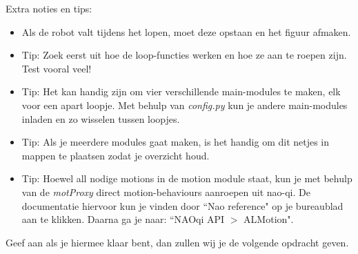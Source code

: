 \documentclass[a4paper]{article}
\begin{document}
Extra noties en tips:
\begin{itemize}
\item Als de robot valt tijdens het lopen, moet deze opstaan en het figuur afmaken.
\item Tip: Zoek eerst uit hoe de loop-functies werken en hoe ze aan te roepen zijn. Test vooral veel!
\item Tip: Het kan handig zijn om vier verschillende main-modules te maken, elk voor een apart loopje. Met behulp van \textit{config.py} kun je andere main-modules inladen en zo wisselen tussen loopjes.
\item Tip: Als je meerdere modules gaat maken, is het handig om dit netjes in mappen te plaatsen zodat je overzicht houd.

\item Tip: Hoewel all nodige motions in de motion module staat, kun je met behulp van de \textit{motProxy} direct motion-behaviours aanroepen uit nao-qi. De documentatie hiervoor kun je vinden door ``Nao reference" op je bureaublad aan te klikken. Daarna ga je naar: ``NAOqi API $>$ ALMotion". 
\end{itemize}

Geef aan als je hiermee klaar bent, dan zullen wij je de volgende opdracht geven.
\end{document}
